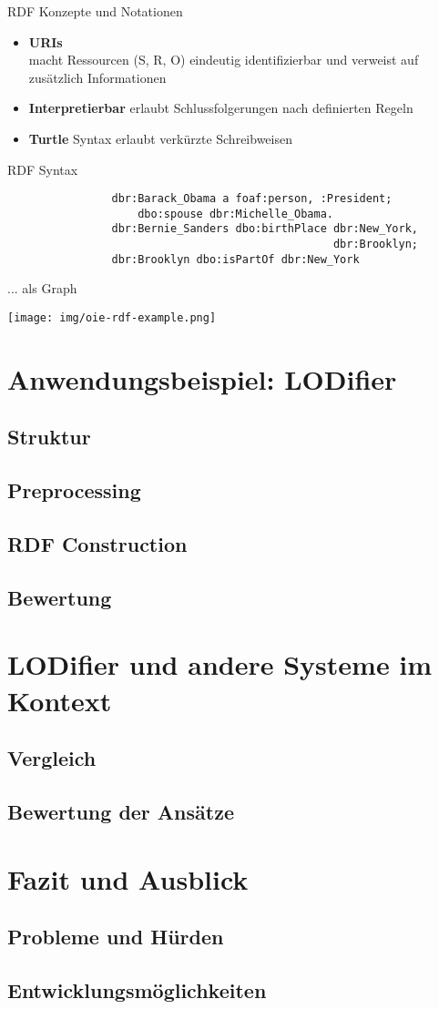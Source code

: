 \documentclass[11pt]{beamer}
\begin{document}
		\begin{frame}{RDF Konzepte und Notationen}
			\begin{itemize}
				\item \textbf{URIs}\\
					macht Ressourcen (S, R, O) eindeutig identifizierbar und verweist auf zusätzlich Informationen
				\item \textbf{Interpretierbar}
					erlaubt Schlussfolgerungen nach definierten Regeln
				\item \textbf{Turtle}
					Syntax erlaubt verkürzte Schreibweisen
			\end{itemize}
		\end{frame}
		
		\begin{frame}[fragile]{RDF Syntax}
			\begin{verbatim}
				dbr:Barack_Obama a foaf:person, :President;
				    dbo:spouse dbr:Michelle_Obama.
				dbr:Bernie_Sanders dbo:birthPlace dbr:New_York, 
				                                  dbr:Brooklyn;
				dbr:Brooklyn dbo:isPartOf dbr:New_York 	
			\end{verbatim}
		\end{frame}
		
		\begin{frame}{... als Graph}
			\begin{center}
				\texttt{[image: img/oie-rdf-example.png]}
			\end{center}			
		\end{frame}
\section{Anwendungsbeispiel: LODifier}
	\subsection{Struktur}
	\subsection{Preprocessing}
	\subsection{RDF Construction}
	\subsection{Bewertung}
\section{LODifier und andere Systeme im Kontext}
	\subsection{Vergleich}
	\subsection{Bewertung der Ansätze}
\section{Fazit und Ausblick}
	\subsection{Probleme und Hürden}
	\subsection{Entwicklungsmöglichkeiten}
\end{document}
